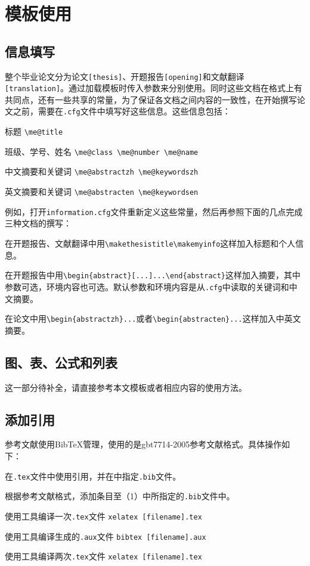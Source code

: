 \documentclass{ecustbachelorthesis}
\begin{document}
\section{模板使用}
\subsection{信息填写}
整个毕业论文分为论文\verb$[thesis]$、开题报告\verb$[opening]$和文献翻译\verb$[translation]$。通过加载模板时传入参数来分别使用。同时这些文档在格式上有共同点，还有一些共享的常量，为了保证各文档之间内容的一致性，在开始撰写论文之前，需要在\verb$.cfg$文件中填写好这些信息。这些信息包括：
\begin{itemlist}
  \item 标题 \verb$\me@title$
  \item 班级、学号、姓名 \verb$\me@class \me@number \me@name$
  \item 中文摘要和关键词 \verb$\me@abstractzh \me@keywordszh$
  \item 英文摘要和关键词 \verb$\me@abstracten \me@keywordsen$
\end{itemlist}

例如，打开\verb$information.cfg$文件重新定义这些常量，然后再参照下面的几点完成三种文档的撰写：
\begin{itemlist}
  \item 在开题报告、文献翻译中用\verb$\makethesistitle\makemyinfo$这样加入标题和个人信息。
  \item 在开题报告中用\verb$\begin{abstract}[...]...\end{abstract}$这样加入摘要，其中参数可选，环境内容也可选。默认参数和环境内容是从\verb$.cfg$中读取的关键词和中文摘要。
  \item 在论文中用\verb$\begin{abstractzh}...$或者\verb$\begin{abstracten}...$这样加入中英文摘要。
\end{itemlist}
\subsection{图、表、公式和列表}
这一部分待补全，请直接参考本文模板或者相应内容的使用方法。
\subsection{添加引用}
参考文献使用BibTeX管理，使用的是gbt7714-2005参考文献格式\cite{gbt}。具体操作如下：
\begin{itemlist}
  \item 在\verb$.tex$文件中使用引用，并在\verb$$中指定\verb$.bib$文件。
  \item 根据参考文献格式，添加条目至（1）中所指定的\verb$.bib$文件中。
  \item 使用工具编译一次\verb$.tex$文件 \verb$xelatex [filename].tex$
  \item 使用工具编译生成的\verb$.aux$文件 \verb$bibtex [filename].aux$
  \item 使用工具编译两次\verb$.tex$文件 \verb$xelatex [filename].tex$
\end{itemlist}
\end{document}
